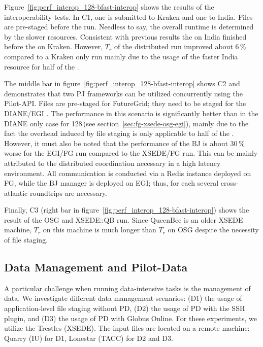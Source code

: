 \documentclass[conference]{IEEEtran}
\begin{document}
Figure~\ref{fig:perf_interop_128-bfast-interop} shows the results of the
interoperability tests. In C1, one \pilot is submitted to Kraken and one to
India. Files are pre-staged before the run. Needless to say, the overall runtime
is determined by the slower resources. Consistent with previous results the
\pilot on India finished before the \pilot on Kraken. However, $T_r$ of the
distributed run improved about 6\,\% compared to a Kraken only run mainly due to
the usage of the faster India resource for half of the \cus.



The middle bar in figure~\ref{fig:perf_interop_128-bfast-interop}
shows C2 and demonstrates that two PJ frameworks can be utilized
concurrently using the Pilot-API. Files are pre-staged for FutureGrid;
they need to be staged for the DIANE/EGI \cus.   The performance in this scenario is
significantly better than in the DIANE only case for 128\,\cus (see
section~\ref{sec:fg-xsede-osg-egi}), mainly due to the fact the
overhead induced by file staging is only applicable to half of the
\cus. However, it must also be noted that the performance of the BJ
\pilot is about 30\,\% worse for the EGI/FG run compared to the
XSEDE/FG run.  This can be mainly attributed to the distributed
coordination necessary in a high latency environment. All
communication is conducted via a Redis instance deployed on FG, while
the BJ manager is deployed on EGI; thus, for each \cu several
cross-atlantic roundtrips are necessary.

Finally, C3 (right bar in figure~\ref{fig:perf_interop_128-bfast-interop})
shows the result of the OSG and XSEDE::QB run. Since QueenBee is an older
XSEDE machine, $T_r$ on this machine is much longer than $T_r$ on OSG despite
the necessity of file staging.

\subsection{Data Management and Pilot-Data}
\label{sec:experiment-pilotdata}

A particular challenge when running data-intensive tasks is the management of
data. We investigate different data management scenarios: (D1) the usage of 
application-level file staging without PD, (D2) the usage of PD with the SSH 
plugin, and (D3) the usage of PD with Globus Online. For these experiments, we
utilize the Trestles (XSEDE). The input files are located on a remote 
machine: Quarry (IU) for D1, Lonestar (TACC) for D2 and D3.
\end{document}
